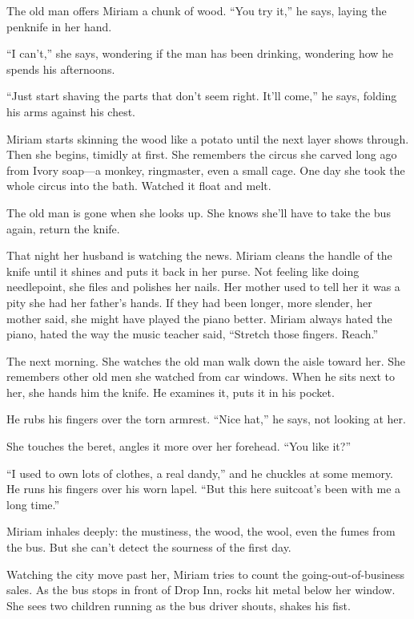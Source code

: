 \documentclass[
]{article}
\begin{document}
The old man offers Miriam a chunk of wood. ``You try it,'' he says,
laying the penknife in her hand.

``I can't,'' she says, wondering if the man has been drinking, wondering
how he spends his afternoons.

``Just start shaving the parts that don't seem right. It'll come,'' he
says, folding his arms against his chest.

Miriam starts skinning the wood like a potato until the next layer shows
through. Then she begins, timidly at first. She remembers the circus she
carved long ago from Ivory soap---a monkey, ringmaster, even a small
cage. One day she took the whole circus into the bath. Watched it float
and melt.

The old man is gone when she looks up. She knows she'll have to take the
bus again, return the knife.

That night her husband is watching the news. Miriam cleans the handle of
the knife until it shines and puts it back in her purse. Not feeling
like doing needlepoint, she files and polishes her nails. Her mother
used to tell her it was a pity she had her father's hands. If they had
been longer, more slender, her mother said, she might have played the
piano better. Miriam always hated the piano, hated the way the music
teacher said, ``Stretch those fingers. Reach.''

The next morning. She watches the old man walk down the aisle toward
her. She remembers other old men she watched from car windows. When he
sits next to her, she hands him the knife. He examines it, puts it in
his pocket.

He rubs his fingers over the torn armrest. ``Nice hat,'' he says, not
looking at her.

She touches the beret, angles it more over her forehead. ``You like
it?''

``I used to own lots of clothes, a real dandy,'' and he chuckles at some
memory. He runs his fingers over his worn lapel. ``But this here
suitcoat's been with me a long time.''

Miriam inhales deeply: the mustiness, the wood, the wool, even the fumes
from the bus. But she can't detect the sourness of the first day.

Watching the city move past her, Miriam tries to count the
going-out-of-business sales. As the bus stops in front of Drop Inn,
rocks hit metal below her window. She sees two children running as the
bus driver shouts, shakes his fist.
\end{document}
